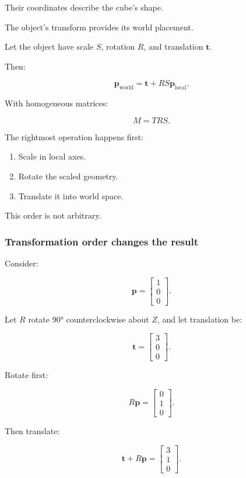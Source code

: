 Their coordinates describe the cube's shape.

The object's transform provides its world placement.

Let the object have scale \(S\), rotation \(R\), and translation \(\mathbf t\).

Then:

\[
 \boxed{ \mathbf p_{\mathrm{world}} = \mathbf t+RS\mathbf p_{\mathrm{local}} }.
\]

With homogeneous matrices:

\[
 \boxed{ M=TRS }.
\]

The rightmost operation happens first:

\begin{enumerate}
\def\labelenumi{\arabic{enumi}.}
\tightlist
\item
  Scale in local axes.
\item
  Rotate the scaled geometry.
\item
  Translate it into world space.
\end{enumerate}

This order is not arbitrary.

\subsubsection{Transformation order changes the result}\label{transformation-order-changes-the-result}

Consider:

\[
 \mathbf p= \begin{bmatrix}1\\0\\0\end{bmatrix}.
\]

Let \(R\) rotate 90° counterclockwise about \(Z\), and let translation be:

\[
 \mathbf t= \begin{bmatrix}3\\0\\0\end{bmatrix}.
\]

Rotate first:

\[
 R\mathbf p= \begin{bmatrix}0\\1\\0\end{bmatrix}.
\]

Then translate:

\[
 \mathbf t+R\mathbf p= \begin{bmatrix}3\\1\\0\end{bmatrix}.
\]

